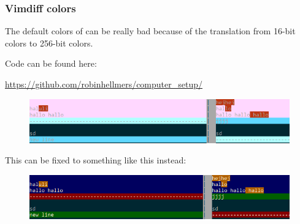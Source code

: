 \subsubsection{Vimdiff colors}

The default colors of  can be really bad because of the translation from 16-bit colors to 256-bit colors.

Code can be found here:

\url{https://github.com/robinhellmers/computer_setup/}

\begin{figure}[H]
    \centering
    \includegraphics[width = \textwidth]{Figures/WSL/colors_vimdiff_defualt.PNG}
\end{figure}

This can be fixed to something like this instead:

\begin{figure}[H]
    \centering
    \includegraphics[width = \textwidth]{Figures/WSL/colors_vimdiff_customized.PNG}
\end{figure}

